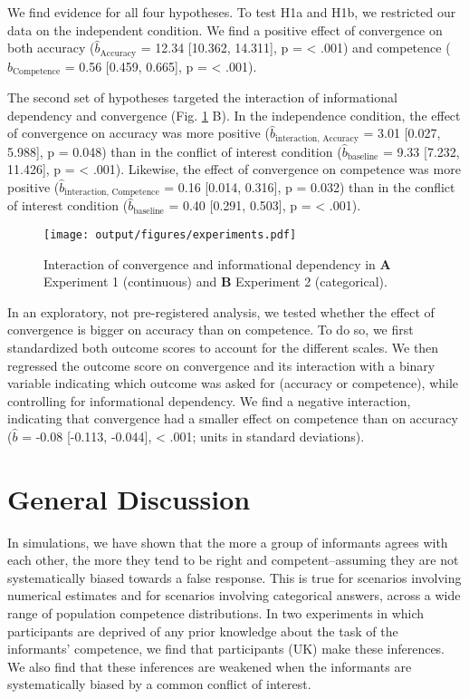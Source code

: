 \documentclass[
  doc,floatsintext]{apa6}
\begin{document}
We find evidence for all four hypotheses. To test H1a and H1b, we restricted our data on the independent condition. We find a positive effect of convergence on both accuracy (\(\hat{b}_{\text{Accuracy}}\) = 12.34 {[}10.362, 14.311{]}, p = \textless{} .001) and competence (\(\hat{b}_{\text{Competence}}\) = 0.56 {[}0.459, 0.665{]}, p = \textless{} .001).

The second set of hypotheses targeted the interaction of informational dependency and convergence (Fig. \ref{fig:experiments} B). In the independence condition, the effect of convergence on accuracy was more positive (\(\hat{b}_{\text{interaction, Accuracy}}\) = 3.01 {[}0.027, 5.988{]}, p = 0.048) than in the conflict of interest condition (\(\hat{b}_{\text{baseline}}\) = 9.33 {[}7.232, 11.426{]}, p = \textless{} .001). Likewise, the effect of convergence on competence was more positive (\(\hat{b}_{\text{interaction, Competence}}\) = 0.16 {[}0.014, 0.316{]}, p = 0.032) than in the conflict of interest condition (\(\hat{b}_{\text{baseline}}\) = 0.40 {[}0.291, 0.503{]}, p = \textless{} .001).



\begin{figure}
\centering
\texttt{[image: output/figures/experiments.pdf]}
\caption{\label{fig:experiments}Interaction of convergence and informational dependency in \textbf{A} Experiment 1 (continuous) and \textbf{B} Experiment 2 (categorical).}
\end{figure}

In an exploratory, not pre-registered analysis, we tested whether the effect of convergence is bigger on accuracy than on competence. To do so, we first standardized both outcome scores to account for the different scales. We then regressed the outcome score on convergence and its interaction with a binary variable indicating which outcome was asked for (accuracy or competence), while controlling for informational dependency. We find a negative interaction, indicating that convergence had a smaller effect on competence than on accuracy (\(\hat{b}\) = -0.08 {[}-0.113, -0.044{]}, \textless{} .001; units in standard deviations).

\hypertarget{general-discussion}{%
\section{General Discussion}\label{general-discussion}}

In simulations, we have shown that the more a group of informants agrees with each other, the more they tend to be right and competent--assuming they are not systematically biased towards a false response. This is true for scenarios involving numerical estimates and for scenarios involving categorical answers, across a wide range of population competence distributions. In two experiments in which participants are deprived of any prior knowledge about the task of the informants' competence, we find that participants (UK) make these inferences. We also find that these inferences are weakened when the informants are systematically biased by a common conflict of interest.
\end{document}
